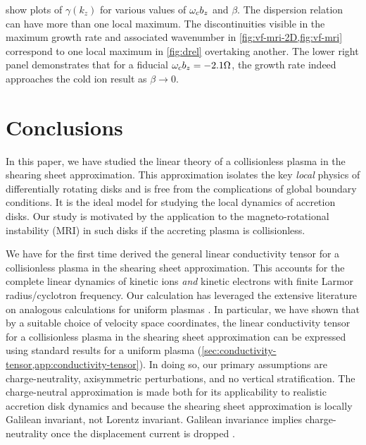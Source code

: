 \documentclass[aps,pre,notitlepage,amsmath,amssymb,amsfonts,nobibnotes,nofootinbib,superscriptaddress]{revtex4-1}
\begin{document}
 show plots of $\gamma(k_z)$ for various values of $\omega_c{}b_z$
and $\beta$. The dispersion relation can have more than one local maximum. The
discontinuities visible in the maximum growth rate and associated wavenumber
in \cref{fig:vf-mri-2D,fig:vf-mri} correspond to one local maximum in
\cref{fig:drel} overtaking another. The lower right panel demonstrates that
for a fiducial $\omega_c{}b_z=-2.1\Omega$, the growth rate indeed approaches the
cold ion result as $\beta\to0$.

\section{Conclusions}\label{sec:conclusions}

In this paper, we have studied the linear theory of a collisionless plasma in
the shearing sheet approximation. This approximation isolates the key
\emph{local} physics of differentially rotating disks and is free from the
complications of global boundary conditions. It is the ideal model for
studying the local dynamics of accretion disks. Our study is motivated by the
application to the magneto-rotational instability (MRI) in such disks if the
accreting plasma is collisionless.

We have for the first time derived the general linear conductivity tensor for
a collisionless plasma in the shearing sheet approximation. This accounts for
the complete linear dynamics of kinetic ions \emph{and} kinetic electrons with
finite Larmor radius/cyclotron frequency. Our calculation has leveraged the
extensive literature on analogous calculations for uniform plasmas
\citep{Ichimaru1973}. In particular, we have shown that by a suitable choice
of velocity space coordinates, the linear conductivity tensor for a
collisionless plasma in the shearing sheet approximation can be expressed
using standard results for a uniform plasma
(\cref{sec:conductivity-tensor,app:conductivity-tensor}). In doing so, our
primary assumptions are charge-neutrality, axisymmetric perturbations, and no
vertical stratification. The charge-neutral approximation is made both for its
applicability to realistic accretion disk dynamics and because the shearing
sheet approximation is locally Galilean invariant, not Lorentz invariant.
Galilean invariance implies charge-neutrality once the displacement current is
dropped \citep{Grad1966}.
\end{document}
